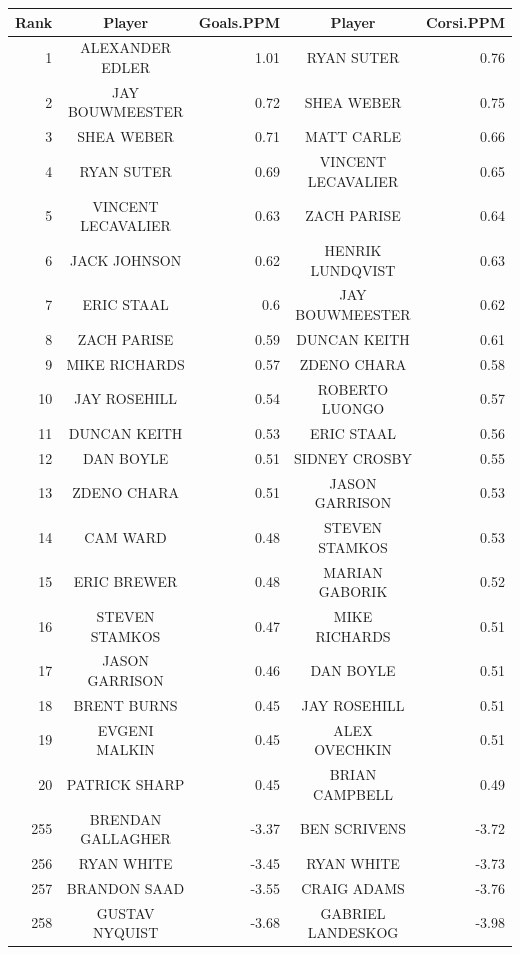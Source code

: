 \begin{table}[p]
	\centering\small
	\begin{tabular}{r c r | c r  }
		Rank & Player & Goals.PPM  & Player & Corsi.PPM  \\ 
		\hline\rule{0pt}{4ex} 
		1     & ALEXANDER EDLER & 1.01  & RYAN SUTER & 0.76 \\
		2     & JAY BOUWMEESTER & 0.72  & SHEA WEBER & 0.75 \\
		3     & SHEA WEBER & 0.71  & MATT CARLE & 0.66 \\
		4     & RYAN SUTER & 0.69  & VINCENT LECAVALIER & 0.65 \\
		5     & VINCENT LECAVALIER & 0.63  & ZACH PARISE & 0.64 \\
		6     & JACK JOHNSON & 0.62  & HENRIK LUNDQVIST & 0.63 \\
		7     & ERIC STAAL & 0.6   & JAY BOUWMEESTER & 0.62 \\
		8     & ZACH PARISE & 0.59  & DUNCAN KEITH & 0.61 \\
		9     & MIKE RICHARDS & 0.57  & ZDENO CHARA & 0.58 \\
		10    & JAY ROSEHILL & 0.54  & ROBERTO LUONGO & 0.57 \\
		11    & DUNCAN KEITH & 0.53  & ERIC STAAL & 0.56 \\
		12    & DAN BOYLE & 0.51  & SIDNEY CROSBY & 0.55 \\
		13    & ZDENO CHARA & 0.51  & JASON GARRISON & 0.53 \\
		14    & CAM WARD & 0.48  & STEVEN STAMKOS & 0.53 \\
		15    & ERIC BREWER & 0.48  & MARIAN GABORIK & 0.52 \\
		16    & STEVEN STAMKOS & 0.47  & MIKE RICHARDS & 0.51 \\
		17    & JASON GARRISON & 0.46  & DAN BOYLE & 0.51 \\
		18    & BRENT BURNS & 0.45  & JAY ROSEHILL & 0.51 \\
		19    & EVGENI MALKIN & 0.45  & ALEX OVECHKIN & 0.51 \\
		20    & PATRICK SHARP & 0.45  & BRIAN CAMPBELL & 0.49 \\
		\hline\rule{0pt}{4ex} 
		255   & BRENDAN GALLAGHER & -3.37 & BEN SCRIVENS & -3.72 \\
		256   & RYAN WHITE & -3.45 & RYAN WHITE & -3.73 \\
		257   & BRANDON SAAD & -3.55 & CRAIG ADAMS & -3.76 \\
		258   & GUSTAV NYQUIST & -3.68 & GABRIEL LANDESKOG & -3.98 \\

\end{tabular}
\end{table}

